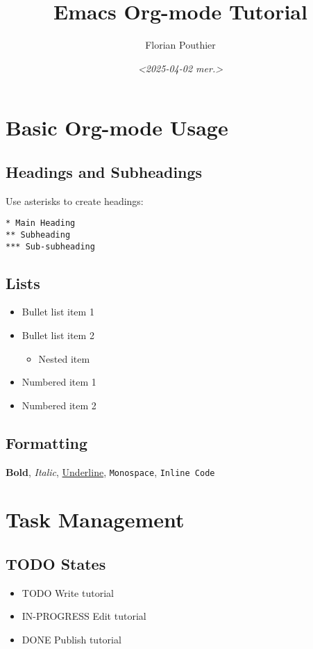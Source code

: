 \documentclass[11pt]{article}
\author{Florian Pouthier}
\date{\textit{<2025-04-02 mer.>}}
\title{Emacs Org-mode Tutorial}
\begin{document}
\maketitle
\tableofcontents


\section{Basic Org-mode Usage}
\label{sec:orgc41cb7a}

\subsection{Headings and Subheadings}
\label{sec:org75f6ccf}
Use asterisks to create headings:
\begin{verbatim}
* Main Heading
** Subheading
*** Sub-subheading
\end{verbatim}

\subsection{Lists}
\label{sec:orgbff6cfc}
\begin{itemize}
\item Bullet list item 1
\item Bullet list item 2
\begin{itemize}
\item Nested item
\end{itemize}
\item Numbered item 1
\item Numbered item 2
\end{itemize}

\subsection{Formatting}
\label{sec:org4c681b0}
\textbf{Bold}, \emph{Italic}, \uline{Underline}, \texttt{Monospace}, \texttt{Inline Code}

\section{Task Management}
\label{sec:org6d90646}

\subsection{{\bfseries\sffamily TODO} States}
\label{sec:org735669b}
\begin{itemize}
\item TODO Write tutorial
\item IN-PROGRESS Edit tutorial
\item DONE Publish tutorial
\end{itemize}
\end{document}

